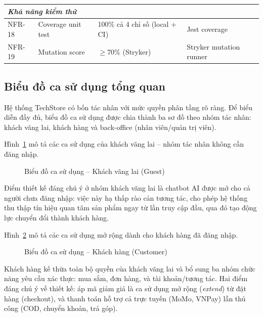 {\begin{longtable}{|l|p{4.5cm}|p{4.2cm}|p{3.3cm}|}
  \multicolumn{4}{|l|}{\textit{Khả năng kiểm thử}} \\
  \hline
  NFR-18 & Coverage unit test & 100\% cả 4 chỉ số (local + CI) & Jest coverage \\
  \hline
  NFR-19 & Mutation score & $\geq$70\% (Stryker) & Stryker mutation runner \\
  \hline
\end{longtable}
}

\subsection{Biểu đồ ca sử dụng tổng quan}

Hệ thống TechStore có bốn tác nhân với mức quyền phân tầng rõ ràng. Để biểu diễn đầy đủ, biểu đồ ca sử dụng được chia thành ba sơ đồ theo nhóm tác nhân: khách vãng lai, khách hàng và back-office (nhân viên\slash quản trị viên).

Hình~\ref{fig:usecase_overview_guest} mô tả các ca sử dụng của khách vãng lai -- nhóm tác nhân không cần đăng nhập.

\begin{figure}[H]
  \centering
  \caption{Biểu đồ ca sử dụng -- Khách vãng lai (Guest)}
  \label{fig:usecase_overview_guest}
\end{figure}

Điểm thiết kế đáng chú ý ở nhóm khách vãng lai là chatbot AI được mở cho cả người chưa đăng nhập: việc này hạ thấp rào cản tương tác, cho phép hệ thống thu thập tín hiệu quan tâm sản phẩm ngay từ lần truy cập đầu, qua đó tạo động lực chuyển đổi thành khách hàng.

Hình~\ref{fig:usecase_overview_customer} mô tả các ca sử dụng mở rộng dành cho khách hàng đã đăng nhập.

\begin{figure}[H]
  \centering
  \caption{Biểu đồ ca sử dụng -- Khách hàng (Customer)}
  \label{fig:usecase_overview_customer}
\end{figure}

Khách hàng kế thừa toàn bộ quyền của khách vãng lai và bổ sung ba nhóm chức năng yêu cầu xác thực: mua sắm, đơn hàng, và tài khoản\slash tương tác. Hai điểm đáng chú ý về thiết kế: áp mã giảm giá là ca sử dụng mở rộng (\textit{extend}) từ đặt hàng (checkout), và thanh toán hỗ trợ cả trực tuyến (MoMo, VNPay) lẫn thủ công (COD, chuyển khoản, trả góp).

